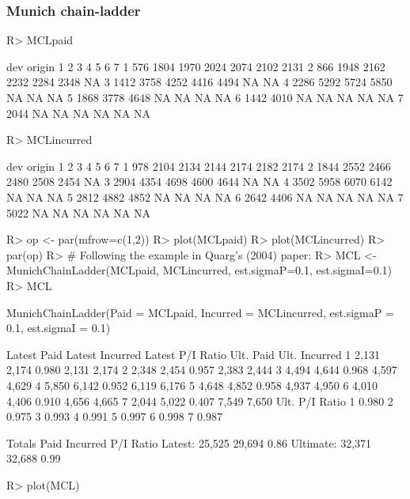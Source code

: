 \documentclass{article}
\begin{document}
\subsubsection{Munich chain-ladder}
\begin{Schunk}
\begin{Sinput}
R> MCLpaid
\end{Sinput}
\begin{Soutput}
      dev
origin    1    2    3    4    5    6    7
     1  576 1804 1970 2024 2074 2102 2131
     2  866 1948 2162 2232 2284 2348   NA
     3 1412 3758 4252 4416 4494   NA   NA
     4 2286 5292 5724 5850   NA   NA   NA
     5 1868 3778 4648   NA   NA   NA   NA
     6 1442 4010   NA   NA   NA   NA   NA
     7 2044   NA   NA   NA   NA   NA   NA
\end{Soutput}
\begin{Sinput}
R> MCLincurred
\end{Sinput}
\begin{Soutput}
      dev
origin    1    2    3    4    5    6    7
     1  978 2104 2134 2144 2174 2182 2174
     2 1844 2552 2466 2480 2508 2454   NA
     3 2904 4354 4698 4600 4644   NA   NA
     4 3502 5958 6070 6142   NA   NA   NA
     5 2812 4882 4852   NA   NA   NA   NA
     6 2642 4406   NA   NA   NA   NA   NA
     7 5022   NA   NA   NA   NA   NA   NA
\end{Soutput}
\begin{Sinput}
R> op <- par(mfrow=c(1,2))
R> plot(MCLpaid)
R> plot(MCLincurred)
R> par(op)
R> # Following the example in Quarg's (2004) paper:
R> MCL <- MunichChainLadder(MCLpaid, MCLincurred, est.sigmaP=0.1, est.sigmaI=0.1)
R> MCL
\end{Sinput}
\begin{Soutput}
MunichChainLadder(Paid = MCLpaid, Incurred = MCLincurred, est.sigmaP = 0.1, 
    est.sigmaI = 0.1)

  Latest Paid Latest Incurred Latest P/I Ratio Ult. Paid Ult. Incurred
1       2,131           2,174            0.980     2,131         2,174
2       2,348           2,454            0.957     2,383         2,444
3       4,494           4,644            0.968     4,597         4,629
4       5,850           6,142            0.952     6,119         6,176
5       4,648           4,852            0.958     4,937         4,950
6       4,010           4,406            0.910     4,656         4,665
7       2,044           5,022            0.407     7,549         7,650
  Ult. P/I Ratio
1          0.980
2          0.975
3          0.993
4          0.991
5          0.997
6          0.998
7          0.987

Totals
            Paid Incurred P/I Ratio
Latest:   25,525   29,694      0.86
Ultimate: 32,371   32,688      0.99
\end{Soutput}
\begin{Sinput}
R> plot(MCL)
\end{Sinput}
\end{Schunk}
\end{document}
